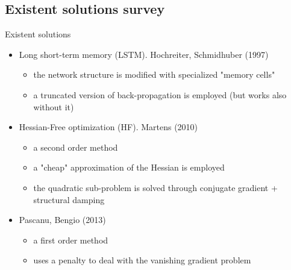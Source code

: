 \subsection{Existent solutions survey}
\begin{frame}{Existent solutions}
	
	\begin{itemize}
		\item Long short-term memory (LSTM). Hochreiter, Schmidhuber (1997)\cite{lstm}
			\begin{itemize}
				\item the network structure is modified with specialized "memory cells"
				\item a truncated version of back-propagation is employed (but works also without it)
			\end{itemize}
		\pause
		\item Hessian-Free optimization (HF). Martens (2010) \cite{hessianFree}
		\begin{itemize}
			\item a second order method
			\item a "cheap" approximation of the Hessian is employed
			\item the quadratic sub-problem is solved through conjugate gradient + structural damping
		\end{itemize}
		\pause
		\item Pascanu, Bengio (2013) \cite{pascanu}
		\begin{itemize}
			\item a first order method
			\item uses a penalty to deal with the vanishing gradient problem
		\end{itemize}
	\end{itemize}
	
\end{frame}

